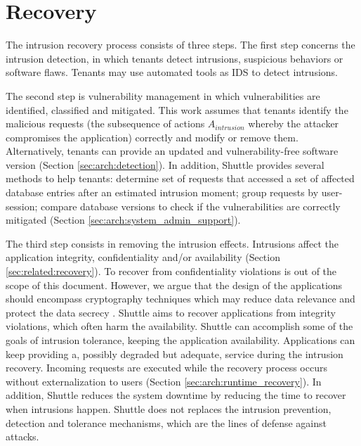 \section{Recovery}
\label{sec:arch:recovery}
The intrusion recovery process consists of three steps. The first step concerns the intrusion detection, in which tenants detect intrusions, suspicious behaviors or software flaws. Tenants may use automated tools as \acf{IDS} \cite{itdb} to detect intrusions.

The second step is vulnerability management in which vulnerabilities are identified, classified and mitigated. This work assumes that tenants identify the malicious requests (the subsequence of actions $A_{intrusion}$ whereby the attacker compromises the application) correctly and modify or remove them. Alternatively, tenants can provide an updated and vulnerability-free software version (Section \ref{sec:arch:detection}).
In addition, Shuttle provides several methods to help tenants: determine set of requests that accessed a set of affected database entries  after an estimated intrusion moment; group requests by user-session; compare database versions to check if the vulnerabilities are correctly mitigated (Section \ref{sec:arch:system_admin_support}). 

The third step consists in removing the intrusion effects. Intrusions affect the application integrity, confidentiality and/or availability (Section \ref{sec:related:recovery}). To recover from confidentiality violations is out of the scope of this document. However, we argue that the design of the applications should encompass cryptography techniques which may reduce data relevance and protect the data secrecy \cite{Maheshwari2000}.
Shuttle aims to recover applications from integrity violations, which often harm the availability. Shuttle can accomplish some of the goals of intrusion tolerance, keeping the application availability. Applications can keep providing a, possibly degraded but adequate, service during the intrusion recovery. Incoming requests are executed while the recovery process occurs without externalization to users (Section \ref{sec:arch:runtime_recovery}). In addition, Shuttle reduces the system downtime by reducing the time to recover when intrusions happen. Shuttle does not replaces the intrusion prevention, detection and tolerance mechanisms, which are the lines of defense against attacks. \\


